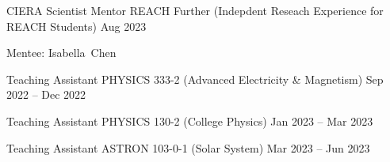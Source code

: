 


\begin{cventries}

\cvsimpentry
{CIERA Scientist Mentor}
{REACH Further (Indepdent Reseach Experience for REACH Students)}
{Aug 2023}
{\begin{cvitems}
	\item {Mentee: Isabella~Chen}
\end{cvitems}}

\cvsimpentry
{Teaching Assistant}
{PHYSICS 333-2 (Advanced Electricity \& Magnetism)}
{Sep 2022 -- Dec 2022}
{}

\cvsimpentry
{Teaching Assistant}
{PHYSICS 130-2 (College Physics)}
{Jan 2023 -- Mar 2023}
{}

\cvsimpentry
{Teaching Assistant}
{ASTRON 103-0-1 (Solar System)}
{Mar 2023 -- Jun 2023}
{}

\end{cventries}